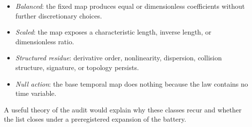 \documentclass[10pt]{article}
\newcommand{\EqClass}[1]{\textit{#1}}
\begin{document}
\begin{itemize}

  \item
  \EqClass{Balanced}: the fixed map produces equal or dimensionless
  coefficients without further discretionary choices.

  \item
  \EqClass{Scaled}: the map exposes a characteristic length, inverse
  length, or dimensionless ratio.

  \item
  \EqClass{Structured residue}: derivative order, nonlinearity,
  dispersion, collision structure, signature, or topology persists.

  \item
  \EqClass{Null action}: the base temporal map does nothing because
  the law contains no time variable.

\end{itemize}

A useful theory of the audit would explain why these classes recur
and whether the list closes under a preregistered expansion of the
battery.
\end{document}
